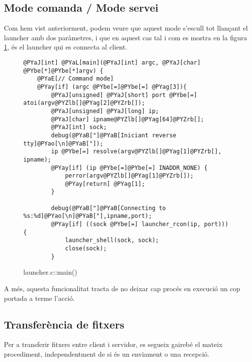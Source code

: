 \subsection{Mode comanda / Mode servei}

Com hem vist anteriorment, podem veure que aquest mode s'escull tot llançant el launcher
amb dos paràmetres, i que en aquest cas tal i com es mostra en la figura \ref{fig:launcher_main},
és el launcher qui es connecta al client.

\begin{figure}[htp]
\begin{Verbatim}[commandchars=@\[\]]
@PYaJ[int] @PYaL[main](@PYaJ[int] argc, @PYaJ[char] @PYbe[*]@PYbe[*]argv) {
    @PYaE[// Command mode]
    @PYay[if] (argc @PYbe[=]@PYbe[=] @PYag[3]){
        @PYaJ[unsigned] @PYaJ[short] port @PYbe[=] atoi(argv@PYZlb[]@PYag[2]@PYZrb[]);
        @PYaJ[unsigned] @PYaJ[long] ip;
        @PYaJ[char] ipname@PYZlb[]@PYag[64]@PYZrb[];
        @PYaJ[int] sock;
        debug(@PYaB["]@PYaB[Iniciant reverse tty]@PYao[\n]@PYaB["]);
        ip @PYbe[=] resolve(argv@PYZlb[]@PYag[1]@PYZrb[], ipname);
        @PYay[if] (ip @PYbe[=]@PYbe[=] INADDR_NONE) {
            perror(argv@PYZlb[]@PYag[1]@PYZrb[]);
            @PYay[return] @PYag[1];
        }

        debug(@PYaB["]@PYaB[Connecting to %s:%d]@PYao[\n]@PYaB["],ipname,port);
        @PYay[if] ((sock @PYbe[=] launcher_rcon(ip, port))) {
            launcher_shell(sock, sock);
            close(sock);
        }
\end{Verbatim}
\caption{launcher.c::main()}
\label{fig:launcher_main}
\end{figure}

A més, aquesta funcionalitat tracta de no deixar cap procés en execució un cop portada a terme l'acció.

\subsection{Transferència de fitxers}

Per a transferir fitxers entre client i servidor, es segueix gairebé el mateix procediment, independentment de si és un enviament o una recepció. \\

